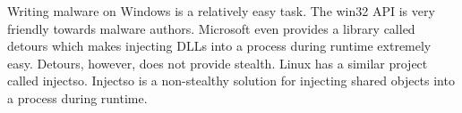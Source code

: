 Writing malware on Windows is a relatively easy task. The win32 API is very friendly
towards malware authors. Microsoft even provides a library called detours which makes
injecting DLLs into a process during runtime extremely easy. Detours, however, does
not provide stealth. Linux has a similar project called injectso. Injectso is a
non-stealthy solution for injecting shared objects into a process during runtime.

